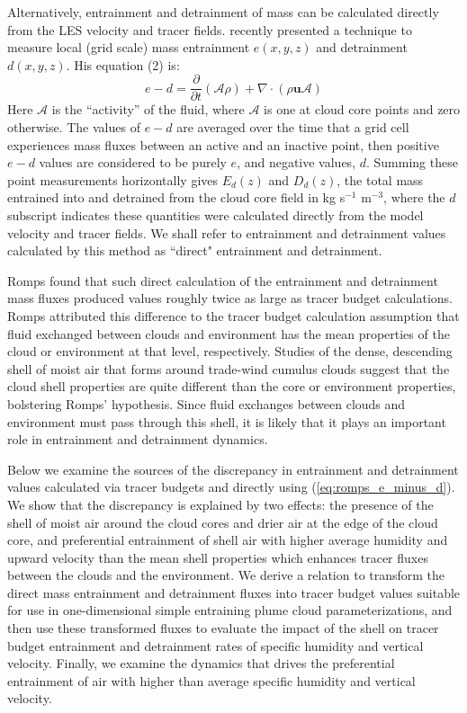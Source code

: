 \documentclass[12pt]{article}
\begin{document}
Alternatively, entrainment and detrainment of mass can be calculated directly
from the LES velocity and tracer fields.  \cite{Romps2010} recently presented a 
technique to measure local (grid scale) mass entrainment $e(x,y,z)$ and
detrainment $d(x,y,z)$.  His equation (2) is:
\begin{equation}
  \label{eq:romps_e_minus_d}
  e - d = \frac{\partial}{\partial t}(\mathcal{A}\rho) 
        + \nabla \cdot (\rho \mathbf{u} \mathcal{A}) 
\end{equation}
Here $\mathcal{A}$ is the ``activity'' of the fluid, where
$\mathcal{A}$ is one at cloud core points and zero otherwise.  The values of
$e - d$ are averaged over the time that a grid cell experiences mass
fluxes between an active and an inactive point, then positive $e-d$
values are considered to be purely $e$, and negative values, $d$.  
Summing these point measurements horizontally gives 
$E_d(z)$ and $D_d(z)$, the total mass entrained into and detrained from the
cloud core field in kg s$^{-1}$ m$^{-3}$, where the $d$ subscript indicates 
these quantities were calculated directly from the model velocity and tracer
fields.  We shall refer to entrainment and detrainment values
calculated by this method as ``direct" entrainment and detrainment.

Romps found that such direct calculation of the entrainment and
detrainment mass fluxes produced values roughly twice as large as
tracer budget calculations.  Romps attributed this difference to the 
tracer budget calculation assumption that fluid exchanged between clouds 
and environment has the mean properties of the cloud or environment at 
that level, respectively.  Studies of the dense, descending shell of 
moist air that forms around trade-wind cumulus clouds 
\citep{Jonas1990, Rodts2003, Heus2008, Jonker2008, Heus2009, Wang2010} 
suggest that the cloud shell properties are quite different than the core 
or environment properties, bolstering Romps' hypothesis.  Since fluid 
exchanges between clouds and environment must pass through this shell, it 
is likely that it plays an important role in entrainment and detrainment
dynamics.

Below we examine the sources of the discrepancy in entrainment and
detrainment values calculated via tracer budgets and directly
using (\ref{eq:romps_e_minus_d}).  We show that the discrepancy is explained by 
two effects: the presence of the shell of moist air around the cloud cores
and drier air at the edge of the cloud core, and preferential entrainment of 
shell air with higher average humidity and upward velocity than the mean shell 
properties which enhances tracer fluxes between the clouds and the environment.
We derive a relation to transform the direct mass entrainment and detrainment 
fluxes into tracer budget values suitable for use in one-dimensional simple 
entraining plume cloud parameterizations, and then use these transformed fluxes 
to evaluate the impact of the shell on tracer budget entrainment and 
detrainment rates of specific humidity and vertical velocity.  Finally, we
examine the dynamics that drives the preferential entrainment of air with 
higher than average specific humidity and vertical velocity.
\end{document}
